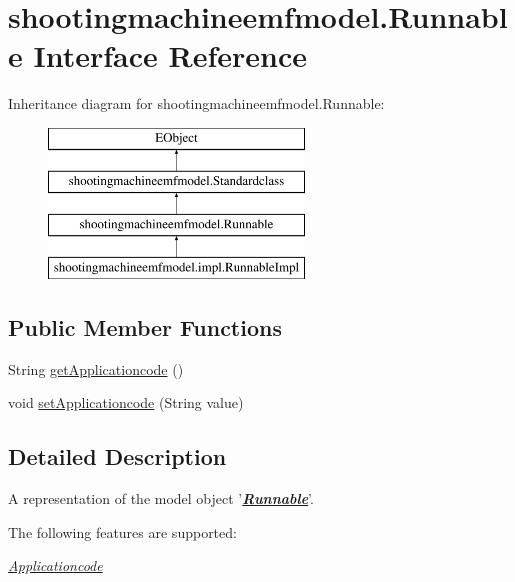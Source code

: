 \hypertarget{interfaceshootingmachineemfmodel_1_1_runnable}{\section{shootingmachineemfmodel.\-Runnable Interface Reference}
\label{interfaceshootingmachineemfmodel_1_1_runnable}
}
Inheritance diagram for shootingmachineemfmodel.\-Runnable\-:\begin{figure}[H]
\begin{center}
\leavevmode
\includegraphics[height=4.000000cm]{interfaceshootingmachineemfmodel_1_1_runnable}
\end{center}
\end{figure}
\subsection*{Public Member Functions}
\begin{DoxyCompactItemize}
\item 
String \hyperlink{interfaceshootingmachineemfmodel_1_1_runnable_addcf9726cce877604aec3b7cdffc572a}{get\-Applicationcode} ()
\item 
void \hyperlink{interfaceshootingmachineemfmodel_1_1_runnable_a375c42a3a95143659b480eed5cb2df99}{set\-Applicationcode} (String value)
\end{DoxyCompactItemize}


\subsection{Detailed Description}
A representation of the model object '{\itshape {\bfseries \hyperlink{interfaceshootingmachineemfmodel_1_1_runnable}{Runnable}}}'.

The following features are supported\-: 
\begin{DoxyItemize}
\item \hyperlink{interfaceshootingmachineemfmodel_1_1_runnable_addcf9726cce877604aec3b7cdffc572a}{{\itshape Applicationcode}} 
\end{DoxyItemize}

